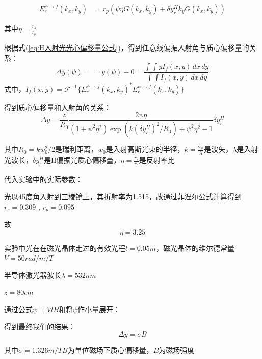 \documentclass[12pt]{ctexart}
\numberwithin{equation}{section} %
\begin{document}
\begin{align}
    E_r^{\psi \to f}(k_x,k_y) &=r_p(\psi \eta G(k_x,k_y)+\delta y_r^Hk_yG(k_x,k_y))
\label{eq:任意方向入射光动量空间场强分布（终极版）}
\end{align}

其中$\eta=\frac{r_s}{r_p}$

根据式(\ref{eq:H入射光光心偏移量公式})，得到任意线偏振入射角与质心偏移量的关系：
\begin{equation}
    \Delta y (\psi)== \overline{y}(\psi) - 0 = \frac{\int \int y I_{f}(x,y) \, dx \, dy}{\int \int I_{f}(x,y) \, dx \, dy}
\end{equation}
式中，$I_f(x,y) = \mathcal{F}^{-1}\{E_r^{\psi \to f }(k_x,k_y)^* E_r^{\psi \to f}(k_x,k_y)\}$

得到质心偏移量和入射角的关系：
\begin{equation}
    \Delta y=\frac{z}{R_{0}}\frac{2\psi\eta}{(1+\psi^{2}\eta^{2})\exp(k(\delta y_{r}^{H})^2/R_{0})+\psi^{2}\eta^{2}-1}\delta y_{r}^{H}
\label{eq:入射角与质心偏移量关系}
\end{equation}

其中$R_0=kw_0^2/2$是瑞利距离，$w_0$是入射高斯光束的半径，$k=\frac{2\pi}{\lambda}$是波矢，$\lambda$是入射光波长，$\delta y_{r}^{H}$是H偏振光质心偏移量，$\eta=\frac{r_s}{r_p}$是反射率比


代入实验中的实际参数：

光以45度角入射到三棱镜上，其折射率为1.515，故通过菲涅尔公式计算得到$r_s=0.309$ , $r_p=0.095$

故$$\eta=3.25$$

实验中光在在磁光晶体走过的有效光程$l=0.05m$，磁光晶体的维尔德常量$V=50rad/m/T$

半导体激光器波长$\lambda=532nm$

$z=80cm$

通过公式$\psi=VlB$和将$\psi $作小量展开：

得到最终我们的结果：
    $$\Delta y= \sigma B$$

    其中$\sigma=1.326 m/T B $为单位磁场下质心偏移量，$B$为磁场强度
\end{document}
